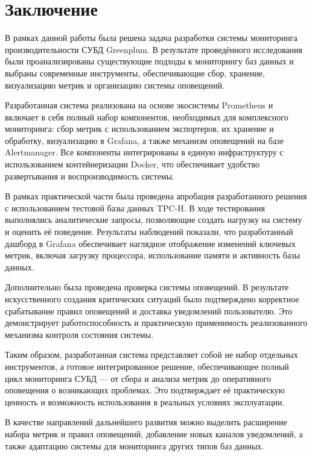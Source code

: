 \chapter*{Заключение} \label{ch-conclusion}

В рамках данной работы была решена задача разработки системы мониторинга производительности СУБД Greenplum. В результате проведённого исследования были проанализированы существующие подходы к мониторингу баз данных и выбраны современные инструменты, обеспечивающие сбор, хранение, визуализацию метрик и организацию системы оповещений.

Разработанная система реализована на основе экосистемы Prometheus и включает в себя полный набор компонентов, необходимых для комплексного мониторинга: сбор метрик с использованием экспортеров, их хранение и обработку, визуализацию в Grafana, а также механизм оповещений на базе Alertmanager. Все компоненты интегрированы в единую инфраструктуру с использованием контейнеризации Docker, что обеспечивает удобство развертывания и воспроизводимость системы.

В рамках практической части была проведена апробация разработанного решения с использованием тестовой базы данных TPC-H. В ходе тестирования выполнялись аналитические запросы, позволяющие создать нагрузку на систему и оценить её поведение. Результаты наблюдений показали, что разработанный дашборд в Grafana обеспечивает наглядное отображение изменений ключевых метрик, включая загрузку процессора, использование памяти и активность базы данных.

Дополнительно была проведена проверка системы оповещений. В результате искусственного создания критических ситуаций было подтверждено корректное срабатывание правил оповещений и доставка уведомлений пользователю. Это демонстрирует работоспособность и практическую применимость реализованного механизма контроля состояния системы.

Таким образом, разработанная система представляет собой не набор отдельных инструментов, а готовое интегрированное решение, обеспечивающее полный цикл мониторинга СУБД — от сбора и анализа метрик до оперативного оповещения о возникающих проблемах. Это подтверждает её практическую ценность и возможность использования в реальных условиях эксплуатации.

В качестве направлений дальнейшего развития можно выделить расширение набора метрик и правил оповещений, добавление новых каналов уведомлений, а также адаптацию системы для мониторинга других типов баз данных.